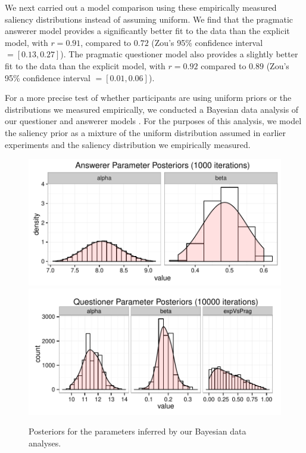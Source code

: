 \documentclass[12pt, floatsintext, jou]{apa6}
\begin{document}
We next carried out a model comparison using these empirically measured saliency distributions instead of assuming uniform. We find that the pragmatic answerer model provides a significantly better fit to the data than the explicit model, with $r=0.91$, compared to $0.72$ (Zou's 95\% confidence interval $= [0.13, 0.27]$). The pragmatic questioner model also provides a slightly better fit to the data than the explicit model, with $r = 0.92$ compared to $0.89$ (Zou's 95\% confidence interval $= [0.01, 0.06]$). 

For a more precise test of whether participants are using uniform priors or the distributions we measured empirically, we conducted a Bayesian data analysis of our questioner and answerer models \cite{HemmerTauberSteyvers15_BDAplus}. For the purposes of this analysis, we model the saliency prior as a mixture of the uniform distribution assumed in earlier experiments and the saliency distribution we empirically measured. 

\begin{figure}[th!]
\begin{center}
\includegraphics[scale=.5]{AnswererParamPosteriors.pdf}
\includegraphics[scale=.5]{QuestionerParamPosteriors.pdf}
\end{center}
\caption{Posteriors for the parameters inferred by our Bayesian data analyses. 
}
\label{fig:BayesianParamPosteriors}
\end{figure}
\end{document}
